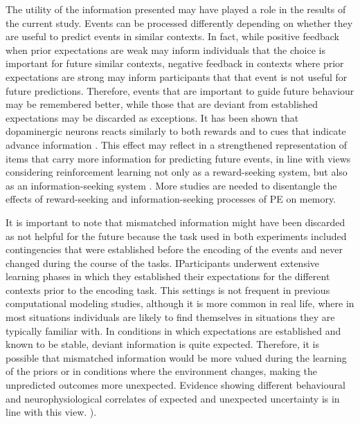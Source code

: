 \documentclass[a4paper,12pt]{article}
\begin{document}
 The utility of the information presented may have played a role in the results of the current study. Events can be processed differently depending on whether they are useful to predict events in similar contexts. In fact, while positive feedback when prior expectations are weak may inform individuals that the choice is important for future similar contexts, negative feedback in contexts where prior expectations are strong may inform participants that that event is not useful for future predictions. Therefore, events that are important to guide future behaviour may be remembered better, while those that are deviant from established expectations may be discarded as exceptions. It has been shown that dopaminergic neurons reacts similarly to both rewards and to cues that indicate advance information \cite{ESBromberg-Martin2011}. This effect may reflect in a strengthened representation of items that carry more information for predicting future events, in line with views considering reinforcement learning not only as a reward-seeking system, but also as an information-seeking system \cite{ESBromberg-Martin2011, Niv2011}. More studies are needed to disentangle the effects of reward-seeking and information-seeking processes of PE on memory. \par
 It is important to note that mismatched information might have been discarded as not helpful for the future because the task used in both experiments included contingencies that were established before the encoding of the events and never changed during the course of the tasks.  IParticipants underwent extensive learning phases in which they established their expectations for the different contexts prior to the encoding task. This settings is not frequent in previous computational modeling studies, although it is more common in real life, where in most situations individuals are likely to find themselves in situations they are typically familiar with. In conditions in which expectations are established and known to be stable, deviant information is quite expected. Therefore, it is possible that mismatched information would be more valued during the learning of the priors or in conditions where the environment changes, making the unpredicted outcomes more unexpected. Evidence showing different behavioural and neurophysiological correlates of expected and unexpected uncertainty is in line with this view. \cite{Yu2005}). 
 \par
\end{document}
